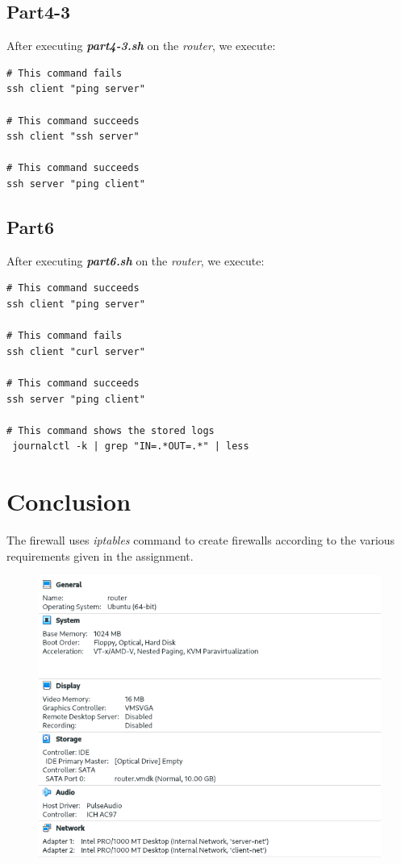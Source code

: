 \documentclass[preprint,12pt]{elsarticle}
\begin{document}
\subsection{Part4-3}
\label{Part43}
After executing \textbf{\textit{part4-3.sh}} on the \textit{router}, we execute:
\begin{lstlisting}
# This command fails
ssh client "ping server"

# This command succeeds
ssh client "ssh server"

# This command succeeds
ssh server "ping client"
\end{lstlisting}

\subsection{Part6}
\label{Part6}
After executing \textbf{\textit{part6.sh}} on the \textit{router}, we execute:
\begin{lstlisting}
# This command succeeds
ssh client "ping server"

# This command fails
ssh client "curl server"

# This command succeeds
ssh server "ping client"

# This command shows the stored logs
 journalctl -k | grep "IN=.*OUT=.*" | less
\end{lstlisting}

\section{Conclusion}
\label{s:Conclusion}
The firewall uses \textit{iptables} command to create firewalls according to the various requirements given in the assignment.



%




\begin{figure}[b]
	\centering
    \centerline{\includegraphics[scale=0.6]{figs/screenshots/router_info.png}}
   \caption{} \label{fig:router_info}
\end{figure}
\end{document}

